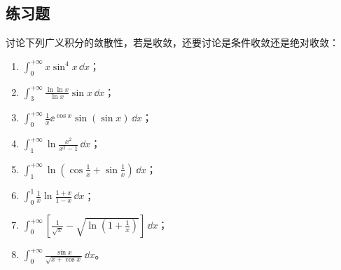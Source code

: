 \subsection{练习题}

\begin{xexercise}[1]
讨论下列广义积分的敛散性，若是收敛，还要讨论是条件收敛还是绝对收敛：
  \begin{enumerate}[label=(\arabic*)]
    \item $\displaystyle\int_0^{+\infty}x\sin^4x\,\dd x$；
    \item $\displaystyle\int_3^{+\infty}\frac{\ln\ln x}{\ln x}\sin x\,\dd x$；
    \item $\displaystyle\int_0^{+\infty}\frac1x\ee^{\cos x}\sin(\sin x)\,\dd x$；
    \item $\displaystyle\int_1^{+\infty}\ln\frac{x^2}{x^2-1}\,\dd x$；
    \item $\displaystyle\int_1^{+\infty}\ln\left(\cos\frac1x+\sin\frac1x\right)\,\dd x$；
    \item $\displaystyle\int_0^1\frac1x\ln\frac{1+x}{1-x}\,\dd x$；
    \item $\displaystyle\int_0^{+\infty}\left[\frac1{\sqrt{x}}-\sqrt{\ln\left(1+\frac1x\right)}\right]\,\dd x$；
    \item $\displaystyle\int_0^{+\infty}\frac{\sin x}{\sqrt{x+\cos x}}\,\dd x$。
  \end{enumerate}
\end{xexercise}
